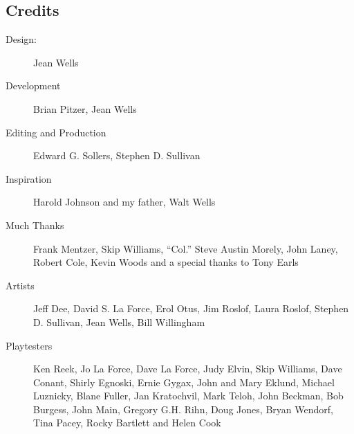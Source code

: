 \documentclass[palace_of_the_silver_princess]{subfiles}
\begin{document}
    \subsection{Credits}
    \begin{description}
        \item[Design:] Jean Wells

        \item[Development] Brian Pitzer, Jean Wells

        \item[Editing and Production] Edward G. Sollers, Stephen D. Sullivan

        \item[Inspiration] Harold Johnson and my father, Walt Wells

        \item[Much Thanks] Frank Mentzer, Skip Williams, “Col.” Steve Austin
            Morely, John Laney, Robert Cole, Kevin Woods and
            a special thanks to Tony Earls

        \item[Artists] Jeff Dee, David S. La Force, Erol Otus, Jim Roslof,
            Laura Roslof, Stephen D. Sullivan, Jean Wells,
            Bill Willingham

        \item[Playtesters] Ken Reek, Jo La Force, Dave La Force, Judy Elvin,
            Skip Williams, Dave Conant, Shirly Egnoski, Ernie Gygax, John
            and Mary Eklund, Michael Luznicky, Blane Fuller, Jan Kratochvil,
            Mark Teloh, John Beckman, Bob Burgess, John Main, Gregory G.H.
            Rihn, Doug Jones, Bryan Wendorf, Tina Pacey, Rocky Bartlett and
            Helen Cook
    \end{description}
\end{document}

